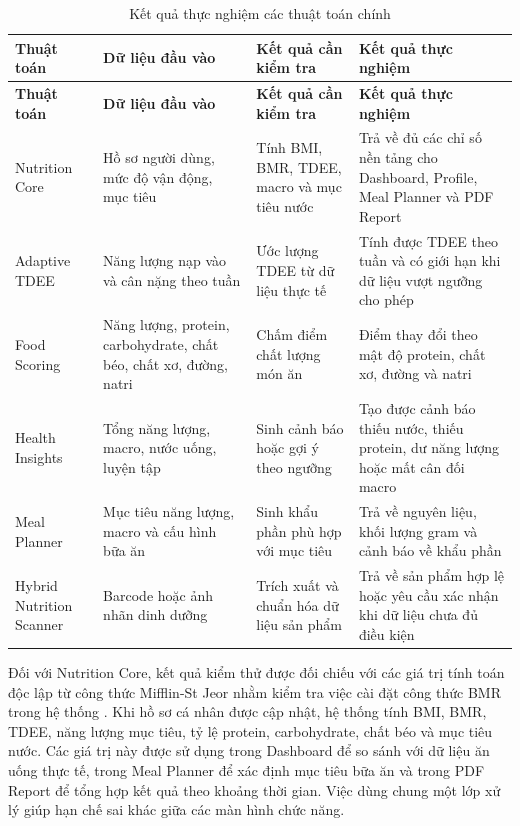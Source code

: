 \documentclass[12pt, a4paper]{report}
\begin{document}
\begin{longtable}{|>{\raggedright\arraybackslash}p{3cm}|>{\raggedright\arraybackslash}p{3cm}|>{\raggedright\arraybackslash}p{4cm}|>{\raggedright\arraybackslash}p{5cm}|}
\caption{Kết quả thực nghiệm các thuật toán chính}
\label{tab:kq_thuc_nghiem_thuat_toan} \\
\hline
\textbf{Thuật toán} & \textbf{Dữ liệu đầu vào} & \textbf{Kết quả cần kiểm tra} & \textbf{Kết quả thực nghiệm} \\
\hline
\endfirsthead
\hline
\textbf{Thuật toán} & \textbf{Dữ liệu đầu vào} & \textbf{Kết quả cần kiểm tra} & \textbf{Kết quả thực nghiệm} \\
\hline
\endhead

Nutrition Core & Hồ sơ người dùng, mức độ vận động, mục tiêu & Tính BMI, BMR, TDEE, macro và mục tiêu nước & Trả về đủ các chỉ số nền tảng cho Dashboard, Profile, Meal Planner và PDF Report \\
\hline
Adaptive TDEE & Năng lượng nạp vào và cân nặng theo tuần & Ước lượng TDEE từ dữ liệu thực tế & Tính được TDEE theo tuần và có giới hạn khi dữ liệu vượt ngưỡng cho phép \\
\hline
Food Scoring & Năng lượng, protein, carbohydrate, chất béo, chất xơ, đường, natri & Chấm điểm chất lượng món ăn & Điểm thay đổi theo mật độ protein, chất xơ, đường và natri \\
\hline
Health Insights & Tổng năng lượng, macro, nước uống, luyện tập & Sinh cảnh báo hoặc gợi ý theo ngưỡng & Tạo được cảnh báo thiếu nước, thiếu protein, dư năng lượng hoặc mất cân đối macro \\
\hline
Meal Planner & Mục tiêu năng lượng, macro và cấu hình bữa ăn & Sinh khẩu phần phù hợp với mục tiêu & Trả về nguyên liệu, khối lượng gram và cảnh báo về khẩu phần \\
\hline
Hybrid Nutrition Scanner & Barcode hoặc ảnh nhãn dinh dưỡng & Trích xuất và chuẩn hóa dữ liệu sản phẩm & Trả về sản phẩm hợp lệ hoặc yêu cầu xác nhận khi dữ liệu chưa đủ điều kiện \\
\hline
\end{longtable}


Đối với Nutrition Core, kết quả kiểm thử được đối chiếu với các giá trị tính toán độc lập từ công thức Mifflin-St Jeor nhằm kiểm tra việc cài đặt công thức BMR trong hệ thống \cite{mifflin1990}. Khi hồ sơ cá nhân được cập nhật, hệ thống tính BMI, BMR, TDEE, năng lượng mục tiêu, tỷ lệ protein, carbohydrate, chất béo và mục tiêu nước. Các giá trị này được sử dụng trong Dashboard để so sánh với dữ liệu ăn uống thực tế, trong Meal Planner để xác định mục tiêu bữa ăn và trong PDF Report để tổng hợp kết quả theo khoảng thời gian. Việc dùng chung một lớp xử lý giúp hạn chế sai khác giữa các màn hình chức năng.
\end{document}
